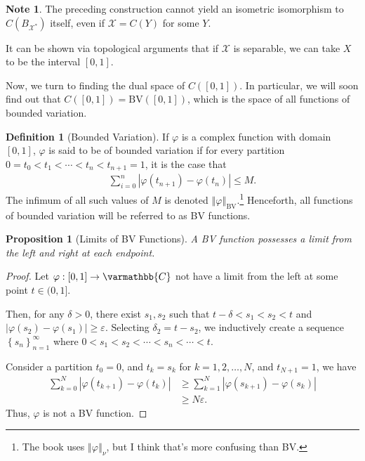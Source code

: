 \documentclass[12pt]{extarticle}
\newcommand{\C}{\mathbb{C}}
\newcommand{\norm}[1]{\left\Vert #1\right\Vert}
\newcommand{\set}[1]{\left\{#1\right\}}
\newcommand{\ve}{\varepsilon}
\theoremstyle{plain}
\newtheorem*{proposition}{Proposition}
\theoremstyle{definition}
\newtheorem*{definition}{Definition}
\theoremstyle{note}
\newtheorem*{note}{Note}
\renewcommand*{\mathbb}[1]{\varmathbb{#1}}
\renewcommand{\newline}{\hfill\break}
\begin{document}
\begin{note}
  The preceding construction cannot yield an isometric isomorphism to $C\left(B_{\mathcal{X}^{\ast}}\right)$ itself, even if $\mathcal{X} = C(Y)$ for some $Y$.\newline

  It can be shown via topological arguments that if $\mathcal{X}$ is separable, we can take $X$ to be the interval $[0,1]$.
\end{note}
Now, we turn to finding the dual space of $C([0,1])$. In particular, we will soon find out that $C([0,1]) = \text{BV}([0,1])$, which is the space of all functions of bounded variation.
\begin{definition}[Bounded Variation]
  If $\varphi$ is a complex function with domain $[0,1]$, $\varphi$ is said to be of bounded variation if for every partition $0 = t_0 < t_1 < \cdots < t_{n} < t_{n+1} = 1$, it is the case that
  \begin{align*}
    \sum_{i=0}^{n}\left\vert \varphi\left(t_{n+1}\right) - \varphi\left(t_{n}\right) \right\vert \leq M.
  \end{align*}
  The infimum of all such values of $M$ is denoted $\norm{\varphi}_{\text{BV}}$.\footnote{The book uses $\norm{\varphi}_{\nu}$, but I think that's more confusing than BV.} Henceforth, all functions of bounded variation will be referred to as BV functions.
\end{definition}
\begin{proposition}[Limits of BV Functions]
  A BV function possesses a limit from the left and right at each endpoint.
\end{proposition}
\begin{proof}
  Let $\varphi: [0,1]\rightarrow \C$ not have a limit from the left at some point $t\in (0,1]$.\newline

  Then, for any $\delta > 0$, there exist $s_1,s_2$ such that $t-\delta < s_1 < s_2 < t$ and $\left\vert \varphi(s_2) - \varphi(s_1) \right\vert \geq \ve$. Selecting $\delta_2 = t - s_2$, we inductively create a sequence $\set{s_n}_{n = 1}^{\infty}$ where $0 < s_1 < s_2 < \cdots < s_n < \cdots < t$.\newline

  Consider a partition $t_0 = 0$, and $t_k= s_k$ for $k = 1,2,\dots,N $, and $t_{N+1} = 1$, we have
  \begin{align*}
    \sum_{k=0}^{N}\left\vert \varphi(t_{k+1}) - \varphi(t_k) \right\vert &\geq \sum_{k=1}^{N}\left\vert \varphi(s_{k+1}) - \varphi(s_{k}) \right\vert\\
                                                                         &\geq N\varepsilon.
  \end{align*}
  Thus, $\varphi$ is not a BV function.
\end{proof}
\end{document}
